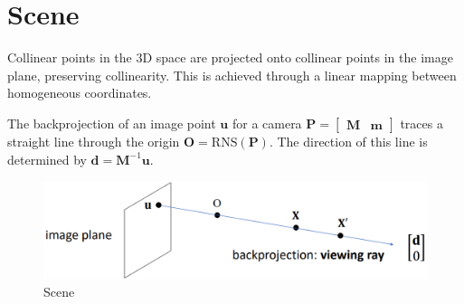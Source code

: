 \section{Scene}

Collinear points in the 3D space are projected onto collinear points in the image plane, preserving collinearity. 
This is achieved through a linear mapping between homogeneous coordinates.

The backprojection of an image point $\mathbf{u}$ for a camera $\mathbf{P}=\begin{bmatrix} \mathbf{M} & \mathbf{m} \end{bmatrix}$ traces a straight line through the origin $\mathbf{O}=\text{RNS}(\mathbf{P})$. 
The direction of this line is determined by $\mathbf{d}=\mathbf{M}^{-1}\mathbf{u}$.
\begin{figure}[H]
    \centering
    \includegraphics[width=0.4\linewidth]{images/scene.png}
    \caption{Scene}
\end{figure}